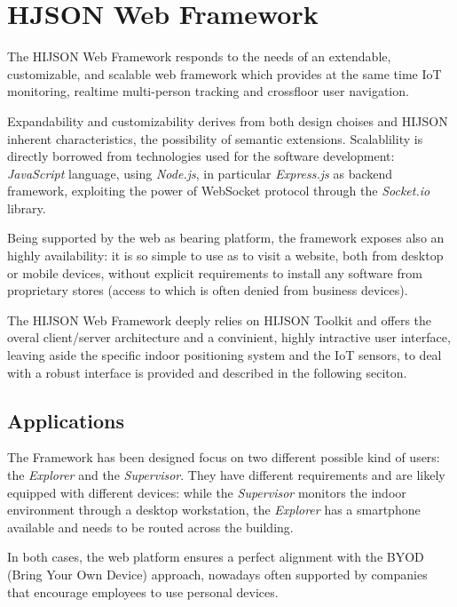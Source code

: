 \section{HJSON Web Framework}\label{hjson-web-framework}

The HIJSON Web Framework responds to the needs of an extendable,
customizable, and scalable web framework which provides at the same time IoT
monitoring, realtime multi-person tracking and crossfloor user
navigation.

Expandability and customizability derives from both design choises and
HIJSON inherent characteristics, the possibility of semantic extensions.
Scalablility is directly borrowed from technologies used for the
software development: \emph{JavaScript} language, using \emph{Node.js},
in particular \emph{Express.js} as backend framework, exploiting the
power of WebSocket protocol through the \emph{Socket.io} library.

Being supported by the web as bearing platform, the framework exposes
also an highly availability: it is so simple to use as to visit a
website, both from desktop or mobile devices, without explicit
requirements to install any software from proprietary stores (access to
which is often denied from business devices).

The HIJSON Web Framework deeply relies on HIJSON Toolkit and offers the
overal client/server architecture and a convinient, highly intractive
user interface, leaving aside the specific indoor positioning system and
the IoT sensors, to deal with a robust interface is provided and
described in the following seciton.

\subsection{Applications}\label{applications}

The Framework has been designed focus on two different possible kind of
users: the \emph{Explorer} and the \emph{Supervisor}. They have
different requirements and are likely equipped with different devices:
while the \emph{Supervisor} monitors the indoor environment through a
desktop workstation, the \emph{Explorer} has a smartphone available and
needs to be routed across the building.

In both cases, the web platform ensures a perfect alignment with the
BYOD (Bring Your Own Device) approach, nowadays often supported by companies
that encourage employees to use personal devices.


